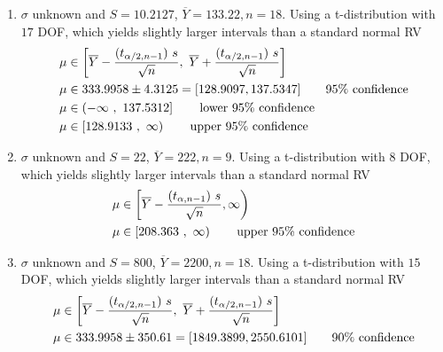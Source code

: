 \begin{enumerate}
	\item $ \sigma $ unknown and $ S = 10.2127 $, $ \overline{Y} = 133.22, n = 18$. Using a t-distribution with $ 17 $ DOF, which yields slightly larger intervals than a standard normal RV\\
	\begin{subequations}
		\begin{align}
			\mu &\in \left[ \overline{Y} - \frac{(t_{\alpha/2, n-1})\ s}{\sqrt{n}}, \ \overline{Y} + \frac{(t_{\alpha/2, n-1})\ s}{\sqrt{n}} \right] \nonumber \\
			\mu &\in 333.9958 \pm 4.3125 = [128.9097, 137.5347] \qquad \text{95\% confidence} \nonumber \\
			\mu &\in \left(-\infty\ ,\  137.5312\right] \qquad \text{lower 95\% confidence} \nonumber \\
			\mu &\in \left[128.9133\ ,\ \infty\right) \qquad \text{upper 95\% confidence}
		\end{align}\\
	\end{subequations}

	\item $ \sigma $ unknown and $ S = 22 $, $ \overline{Y} = 222, n = 9$. Using a t-distribution with $ 8 $ DOF, which yields slightly larger intervals than a standard normal RV\\
	\begin{subequations}
		\begin{align}
			\mu &\in \left[ \overline{Y} - \frac{(t_{\alpha, n-1})\ s}{\sqrt{n}}, \infty \right) \nonumber \\
			\mu &\in \left[208.363\ ,\ \infty\right) \qquad \text{upper 95\% confidence}
		\end{align}\\
	\end{subequations}

	\item $ \sigma $ unknown and $ S = 800 $, $ \overline{Y} = 2200, n = 18$. Using a t-distribution with $ 15 $ DOF, which yields slightly larger intervals than a standard normal RV\\
	\begin{subequations}
		\begin{align}
			\mu &\in \left[ \overline{Y} - \frac{(t_{\alpha/2, n-1})\ s}{\sqrt{n}}, \ \overline{Y} + \frac{(t_{\alpha/2, n-1})\ s}{\sqrt{n}} \right] \nonumber \\
			\mu &\in 333.9958 \pm 350.61 = [1849.3899, 2550.6101] \qquad \text{90\% confidence}
		\end{align}\\
	\end{subequations}


\end{enumerate}
